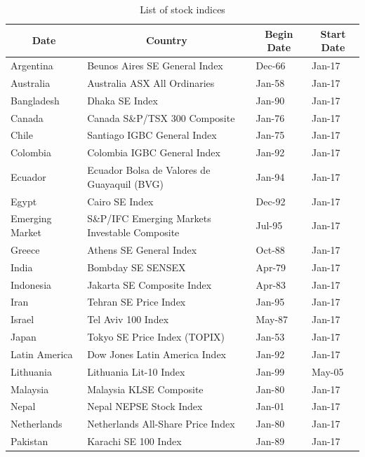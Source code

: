 \documentclass[12pt,final,fleqn]{article}
\theoremstyle{plain}
\begin{document}
\begin{table}[!ht]
\caption{List of stock indices} \label{tab:stock-list}
\vspace{-5pt}
\footnotesize
\begin{center}
\begin{threeparttable}
\begin{tabular*}{\textwidth}{l@{\extracolsep{\fill}}lll}
  \hline
  \hline
  \multicolumn{1}{c}{Date}&\multicolumn{1}{c}{Country}&\multicolumn{1}{c}{Begin Date} &\multicolumn{1}{c}{Start Date}\\
  \hline
Argentina & Beunos Aires SE General Index & Dec-66 & Jan-17\\
Australia & Australia ASX All Ordinaries & Jan-58 & Jan-17\\
Bangladesh & Dhaka SE Index & Jan-90 & Jan-17\\
Canada & Canada S\&P/TSX 300 Composite & Jan-76 & Jan-17\\
Chile & Santiago IGBC General Index & Jan-75 & Jan-17\\
Colombia & Colombia IGBC General Index & Jan-92 & Jan-17\\
Ecuador & Ecuador Bolsa de Valores de Guayaquil (BVG) & Jan-94 & Jan-17\\
Egypt & Cairo SE Index & Dec-92 & Jan-17\\
Emerging Market & S\&P/IFC Emerging Markets Investable Composite & Jul-95 & Jan-17\\
Greece & Athens SE General Index & Oct-88 & Jan-17\\
India & Bombday SE SENSEX & Apr-79 & Jan-17\\
Indonesia & Jakarta SE Composite Index & Apr-83 & Jan-17\\
Iran & Tehran SE Price Index & Jan-95 & Jan-17\\
Israel & Tel Aviv 100 Index & May-87 & Jan-17\\
Japan & Tokyo SE Price Index (TOPIX) & Jan-53 & Jan-17\\
Latin America & Dow Jones Latin America Index & Jan-92 & Jan-17\\
Lithuania & Lithuania Lit-10 Index & Jan-99 & May-05\\
Malaysia & Malaysia KLSE Composite & Jan-80 & Jan-17\\
Nepal & Nepal NEPSE Stock Index & Jan-01 & Jan-17\\
Netherlands & Netherlands All-Share Price Index & Jan-80 & Jan-17\\
Pakistan & Karachi SE 100 Index & Jan-89 & Jan-17\\

\end{tabular*}
\end{threeparttable}
\end{center}
\end{table}
\end{document}
